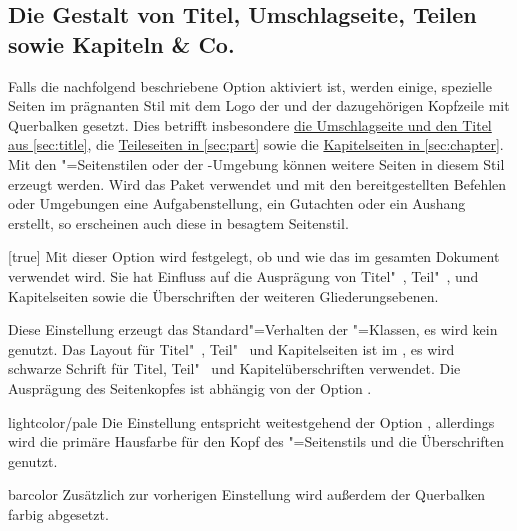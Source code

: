 \begin{Declaration*}{}
\begin{Declaration*}{}
\begin{Declaration*}{}
\subsection{Die Gestalt von Titel, Umschlagseite, Teilen sowie Kapiteln \& Co.}
%
%
%
%
Falls die nachfolgend beschriebene Option  aktiviert ist, 
werden einige, spezielle Seiten im prägnanten Stil mit dem Logo der \TnUD und 
der dazugehörigen Kopfzeile mit Querbalken gesetzt. Dies betrifft insbesondere 
\hyperref[sec:title]{die Umschlagseite und den Titel aus \autoref{sec:title}}, 
die \hyperref[sec:part]{Teileseiten in \autoref{sec:part}} sowie die
\hyperref[sec:chapter]{Kapitelseiten in \autoref{sec:chapter}}. Mit den 
"=Seitenstilen oder der -Umgebung 
können weitere Seiten in diesem Stil erzeugt werden. Wird das Paket 
 verwendet und mit den bereitgestellten Befehlen oder 
Umgebungen eine Aufgabenstellung, ein Gutachten oder ein Aushang erstellt, so 
erscheinen auch diese in besagtem Seitenstil.
%
\begin{Declaration}[%
  v2.03!\Option{cd=bicolor}:%
    Farbeinsatz nur im Kopf mit farbig abgesetztem Querbalken;
  v2.03!\Option{cd=fullcolor}:%
    voller Farbeinsatz mit farbig abgesetztem Querbalken;%
  v2.04!\Option{cd=barcolor}:nur farbig abgesetzter Querbalken;%
]{}[true]
\printdeclarationlist%
%
Mit dieser Option wird festgelegt, ob und wie das \TUDCD im gesamten Dokument 
verwendet wird. Sie hat Einfluss auf die Ausprägung von Titel"~, Teil"~, und 
Kapitelseiten sowie die Überschriften der weiteren Gliederungsebenen.
%
\begin{values}{}
\itemfalse
  Diese Einstellung erzeugt das Standard"=Verhalten der \KOMAScript"=Klassen, 
  es wird kein \CD genutzt.
  Das Layout für Titel"~, Teil"~ und Kapitelseiten ist im \CD, es wird 
  schwarze Schrift für Titel, Teil"~ und Kapitelüberschriften verwendet. Die 
  Ausprägung des Seitenkopfes ist abhängig von der Option .
\item[lightcolor/pale]
  Die Einstellung entspricht weitestgehend der Option , 
  allerdings wird die primäre Hausfarbe  für den Kopf des 
  "=Seitenstils und die Überschriften genutzt.
\item[barcolor]
   Zusätzlich zur vorherigen Einstellung wird außerdem der 
  Querbalken farbig abgesetzt.

\end{values}
\end{Declaration}
\end{Declaration*}
\end{Declaration*}
\end{Declaration*}
